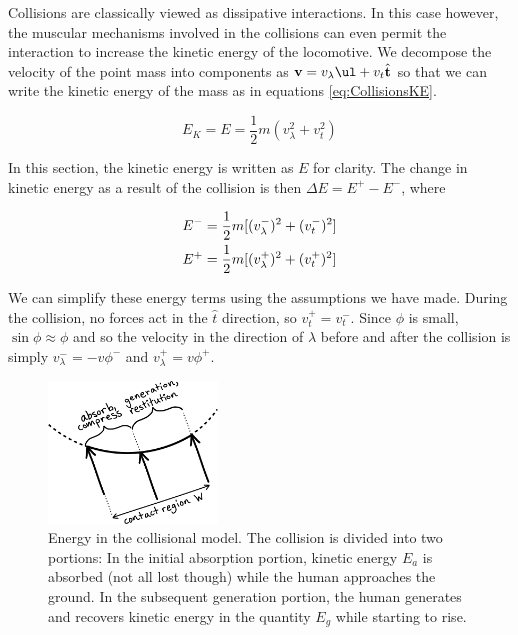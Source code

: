 Collisions are classically viewed as dissipative interactions. In this case however, the muscular mechanisms involved in the collisions can even permit the interaction to increase the kinetic energy of the locomotive. We decompose the velocity of the point mass into components as $\mathbf{v} = v_{\lambda} \ul + v_{t} \hat{\mathbf{t}}$ so that we can write the kinetic energy of the mass as in equations \ref{eq:CollisionsKE}.

\begin{equation}
E_{K} = E = \frac{1}{2}m(v_{\lambda}^{2} + v_{t}^{2})
\label{eq:CollisionsKE}
\end{equation}

In this section, the kinetic energy is written as $E$ for clarity. The change in kinetic energy as a result of the collision is then $\Delta E = E^{+} - E^{-}$, where

\begin{align}
E^{-} &= \frac{1}{2}m[(v_{\lambda}^{-})^2 + (v_{t}^{-})^2]  \notag \\   
E^{+} &= \frac{1}{2}m[(v_{\lambda}^{+})^2 + (v_{t}^{+})^2] \notag
\end{align}

We can simplify these energy terms using the assumptions we have made. During the collision, no forces act in the $\hat{t}$ direction, so $v_{t}^{+} = v_{t}^{-}$. Since $\phi$ is small, $\sin{\phi} \approx \phi$ and so the velocity in the direction of $\hat{\lambda}$ before and after the collision is simply $v_{\lambda}^{-} = -v \phi^{-}$ and $v_{\lambda}^{+} = v \phi^{+}$.

\begin{figure}[h]		%
\begin{centering}
\includegraphics[width=0.4\textwidth]{Figures/BounceEnergy}\par
\end{centering}
\caption[Diagram: Energy in the Collisional Model]{Energy in the collisional model. The collision is divided into two portions: In the initial absorption portion, kinetic energy $E_{a}$ is absorbed (not all lost though) while the human approaches the ground. In the subsequent generation portion, the human generates and recovers kinetic energy in the quantity $E_{g}$ while starting to rise.}
\label{fig:BounceEnergy}
\end{figure}
%

